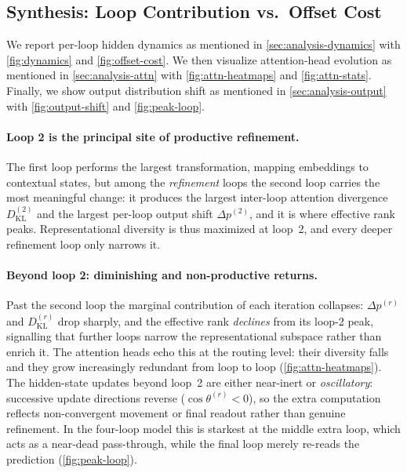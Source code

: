 \documentclass{llmxive}
\begin{document}
\subsection{Synthesis: Loop Contribution vs.\ Offset Cost}
\label{sec:analysis-synthesis}

We report per-loop hidden dynamics as mentioned in \autoref{sec:analysis-dynamics} with \autoref{fig:dynamics}  and \autoref{fig:offset-cost}. We then visualize attention-head evolution as mentioned in \autoref{sec:analysis-attn} with
\autoref{fig:attn-heatmaps} and \autoref{fig:attn-stats}. Finally, we show output distribution shift as mentioned in \autoref{sec:analysis-output} with \autoref{fig:output-shift} and \autoref{fig:peak-loop}.

\paragraph{Loop 2 is the principal site of productive refinement.}
The first loop performs the largest transformation, mapping embeddings to
contextual states, but among the \emph{refinement} loops the second loop
carries the most meaningful change: it produces the largest inter-loop attention
divergence $D_{\text{KL}}^{(2)}$ and the largest per-loop output shift
$\Delta p^{(2)}$, and it is where effective rank peaks.
Representational diversity is thus maximized at loop~2, and every deeper
refinement loop only narrows it.

\paragraph{Beyond loop 2: diminishing and non-productive returns.}
Past the second loop the marginal contribution of each iteration collapses:
$\Delta p^{(r)}$ and $D_{\text{KL}}^{(r)}$ drop sharply, and the effective rank
\emph{declines} from its loop-2 peak, signalling that further loops narrow the
representational subspace rather than enrich it.
The attention heads echo this at the routing level: their diversity falls and
they grow increasingly redundant from loop to loop
(\autoref{fig:attn-heatmaps}).
The hidden-state updates beyond loop~2 are either near-inert or
\emph{oscillatory}: successive update directions reverse ($\cos\theta^{(r)}<0$),
so the extra computation reflects non-convergent movement or final readout
rather than genuine refinement.
In the four-loop model this is starkest at the middle extra loop, which acts as
a near-dead pass-through, while the final loop merely re-reads the prediction
(\autoref{fig:peak-loop}).
\end{document}
